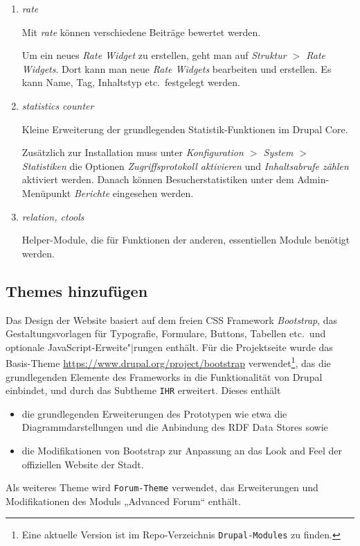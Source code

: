 \documentclass[a4paper,11pt,twoside]{article}
\begin{document}
\begin{enumerate}
\item \emph{rate}

Mit \emph{rate} können verschiedene Beiträge bewertet werden. 

Um ein neues \emph{Rate Widget} zu erstellen, geht man auf \textit{Struktur $>$
  Rate Widgets}.  Dort kann man neue \emph{Rate Widgets} bearbeiten und
erstellen.  Es kann Name, Tag, Inhaltstyp etc.\ festgelegt werden.

\item \emph{statistics counter}

Kleine Erweiterung der grundlegenden Statistik-Funktionen im Drupal Core. 

Zusätzlich zur Installation muss unter \textit{Konfiguration $>$ System $>$
  Statistiken} die Optionen \textit{Zugriffsprotokoll aktivieren} und
\textit{Inhaltsabrufe zählen} aktiviert werden. Danach können
Besucherstatistiken unter dem Admin-Menüpunkt \textit{Berichte} eingesehen
werden.

\item \emph{relation, ctools}

Helper-Module, die für Funktionen der anderen, essentiellen Module benötigt
werden.

\end{enumerate}


\subsection{Themes hinzufügen}
Das Design der Website basiert auf dem freien CSS Framework \emph{Bootstrap},
das Gestaltungsvorlagen für Typografie, Formulare, Buttons, Tabellen etc.\ und
optionale JavaScript-Erweite"|rungen enthält. Für die Projektseite wurde das
Basis-Theme \url{https://www.drupal.org/project/bootstrap}
verwendet\footnote{Eine aktuelle Version ist im Repo-Verzeichnis
  \texttt{Drupal-Modules} zu finden.}, das die grundlegenden Elemente des
Frameworks in die Funktionalität von Drupal einbindet, und durch das Subtheme
\texttt{IHR} erweitert. Dieses enthält
\begin{itemize}\itemsep0pt
\item die grundlegenden Erweiterungen des Prototypen wie etwa die
  Diagrammdarstellungen und die Anbindung des RDF Data Stores sowie 
\item die Modifikationen von Bootstrap zur Anpassung an das Look and Feel der
  offiziellen Website der Stadt.
\end{itemize}
Als weiteres Theme wird \texttt{Forum-Theme} verwendet, das Erweiterungen und
Modifikationen des Moduls „Advanced Forum“ enthält. 
\end{document}
